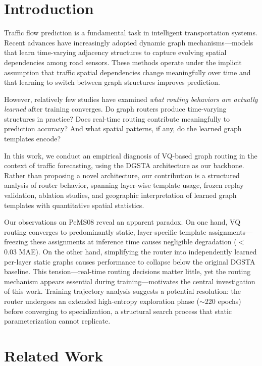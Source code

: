 \documentclass[journal]{IEEEtran}
\begin{document}
\section{Introduction}

Traffic flow prediction is a fundamental task in intelligent transportation systems. Recent advances have increasingly adopted dynamic graph mechanisms---models that learn time-varying adjacency structures to capture evolving spatial dependencies among road sensors. These methods operate under the implicit assumption that traffic spatial dependencies change meaningfully over time and that learning to switch between graph structures improves prediction.

However, relatively few studies have examined \emph{what routing behaviors are actually learned} after training converges. Do graph routers produce time-varying structures in practice? Does real-time routing contribute meaningfully to prediction accuracy? And what spatial patterns, if any, do the learned graph templates encode?

In this work, we conduct an empirical diagnosis of VQ-based graph routing in the context of traffic forecasting, using the DGSTA architecture as our backbone. Rather than proposing a novel architecture, our contribution is a structured analysis of router behavior, spanning layer-wise template usage, frozen replay validation, ablation studies, and geographic interpretation of learned graph templates with quantitative spatial statistics.

Our observations on PeMS08 reveal an apparent paradox. On one hand, VQ routing converges to predominantly static, layer-specific template assignments---freezing these assignments at inference time causes negligible degradation ($<$0.03 MAE). On the other hand, simplifying the router into independently learned per-layer static graphs causes performance to collapse below the original DGSTA baseline. This tension---real-time routing decisions matter little, yet the routing mechanism appears essential during training---motivates the central investigation of this work. Training trajectory analysis suggests a potential resolution: the router undergoes an extended high-entropy exploration phase ($\sim$220 epochs) before converging to specialization, a structural search process that static parameterization cannot replicate.

\section{Related Work}
\end{document}
